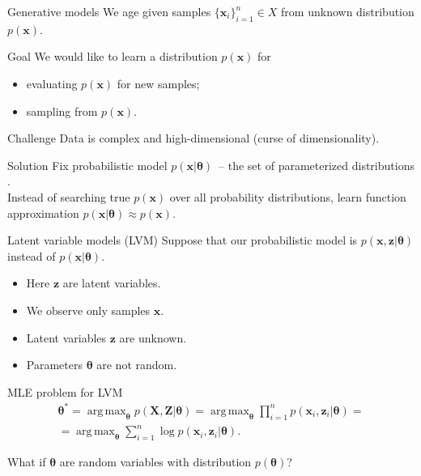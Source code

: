 \documentclass{beamer}
\newcommand{\bx}{\mathbf{x}}
\newcommand{\bz}{\mathbf{z}}
\newcommand{\bX}{\mathbf{X}}
\newcommand{\bZ}{\mathbf{Z}}
\newcommand{\btheta}{\boldsymbol{\theta}}
\DeclareMathOperator*{\argmax}{arg\,max}
\begin{document}
\begin{frame}{Generative models}
    We age given samples $\{\bx_i\}_{i=1}^n \in X$ from unknown distribution $p(\bx)$.
    
    \begin{block}{Goal}
    	We would like to learn a distribution $p(\bx)$ for 
    	\begin{itemize}
    	    \item evaluating $p(\bx)$ for new samples;
    	    \item sampling from $p(\bx)$.
    	\end{itemize}
    \end{block}
    \begin{block}{Challenge}
    	 Data is complex and high-dimensional (curse of dimensionality).
    \end{block}
    \begin{block}{Solution}
        Fix probabilistic model $p(\bx | \btheta)$~-- the set of parameterized distributions . \\
        Instead of searching true $p(\bx)$ over all probability distributions, learn function approximation $p(\bx | \btheta) \approx p(\bx)$.
    \end{block}
\end{frame}
\begin{frame}{Latent variable models (LVM)}
    Suppose that our probabilistic model is $p(\bx, \bz | \btheta)$ instead of $p(\bx | \btheta)$.
    \begin{itemize}
        \item Here $\bz$ are latent variables.
        \item We observe only samples $\bx$. 
        \item Latent variables $\bz$ are unknown.
        \item Parameters $\btheta$ are not random.
    \end{itemize}
    \begin{block}{MLE problem for LVM}
    \vspace{-0.3cm}
    \begin{multline*}
        \btheta^* = \argmax_{\btheta} p(\bX, \bZ | \btheta) = \argmax_{\btheta} \prod_{i=1}^n p(\bx_i, \bz_i | \btheta) = \\ = \argmax_{\btheta} \sum_{i=1}^n \log p(\bx_i, \bz_i | \btheta).
    \end{multline*}
    \vspace{-0.1cm}
    \end{block}
    What if $\btheta$ are random variables with distribution $p(\btheta)$?
\end{frame}
\end{document}
